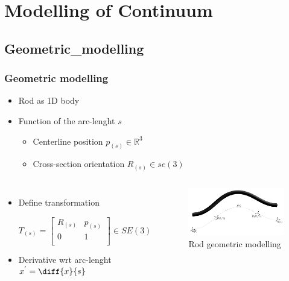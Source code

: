 \documentclass[compress]{thesisbeamer}
\begin{document}
  	\section{Modelling of Continuum}
       	\subsection{Geometric_modelling}
        \begin{frame}
        	\frametitle{Geometric modelling}
			\begin{itemize}%
  				\item Rod as 1D body 
  				\item Function of the arc-lenght $ s $
  				\begin{itemize}%
   					\item Centerline position $ p_{(s)}\in\mathbb{R}^3$
   					\item Cross-section orientation $R_{(s)}\in\textit{se}(3)$
  				\end{itemize}
  			\end{itemize}
  			\begin{columns}
			\begin{itemize}%
  				\item Define transformation
  				\begin{fleqn}
  				\begin{equation}
  					T_{(s)} = 
  					\begin{bmatrix}
  						R_{(s)} & p_{(s)} 	\\
  							0	&	1		\\
  					\end{bmatrix}\in SE(3)
  				\end{equation}
  				\end{fleqn}
  				\item Derivative wrt arc-lenght $ x^{'} = \diff{x}{s} $
 			\end{itemize}
			\vspace{2cm}
			\begin{figure}[h]
				\centering
				\includegraphics[width=\textwidth]{images/rod_geometry}
				\caption{Rod geometric modelling}
			\end{figure}
			\end{columns}
		\end{frame}
\end{document}
